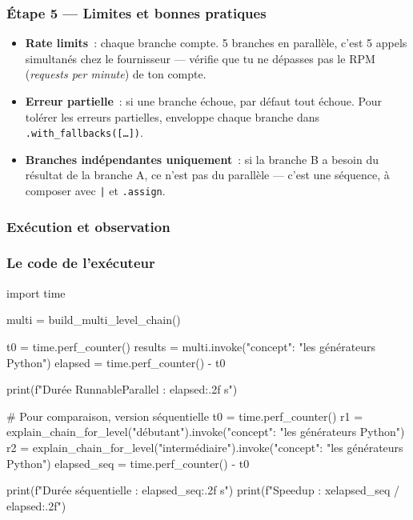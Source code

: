 \documentclass[11pt,a4paper]{article}
\begin{document}
\subsubsection*{Étape 5 — Limites et bonnes pratiques}

\begin{itemize}[leftmargin=*]
  \item \textbf{Rate limits}~: chaque branche compte. 5 branches en
        parallèle, c'est 5 appels simultanés chez le fournisseur — vérifie
        que tu ne dépasses pas le RPM (\emph{requests per minute}) de ton
        compte.
  \item \textbf{Erreur partielle}~: si une branche échoue, par défaut tout
        échoue. Pour tolérer les erreurs partielles, enveloppe chaque
        branche dans \texttt{.with\_fallbacks([\dots])}.
  \item \textbf{Branches indépendantes uniquement}~: si la branche B a
        besoin du résultat de la branche A, ce n'est pas du parallèle —
        c'est une séquence, à composer avec \texttt{|} et \texttt{.assign}.
\end{itemize}

\subsubsection{Exécution et observation}

\subsubsection*{Le code de l'exécuteur}

\begin{pythoncode}
import time

multi = build_multi_level_chain()

t0 = time.perf_counter()
results = multi.invoke({"concept": "les générateurs Python"})
elapsed = time.perf_counter() - t0

print(f"Durée RunnableParallel : {elapsed:.2f} s")

# Pour comparaison, version séquentielle
t0 = time.perf_counter()
r1 = explain_chain_for_level("débutant").invoke({"concept": "les générateurs Python"})
r2 = explain_chain_for_level("intermédiaire").invoke({"concept": "les générateurs Python"})
elapsed_seq = time.perf_counter() - t0

print(f"Durée séquentielle : {elapsed_seq:.2f} s")
print(f"Speedup : x{elapsed_seq / elapsed:.2f}")
\end{pythoncode}
\end{document}
